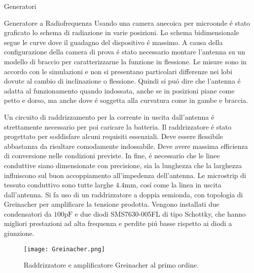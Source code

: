 \begin{section}{Generatori}
\begin{subsection}{Generatore a Radiofrequenza}
        Usando una camera anecoica per microonde \'e stato graficato lo schema di radiazione in varie posizioni. Lo schema bidimensionale segue le curve dove il guadagno del dispositivo \'e massimo. A causa della configurazione della camera di prova \'e stato necessario montare l'antenna su un modello di braccio per caratterizzarne la funzione in flessione. Le misure sono in accordo con le simulazioni e non si presentano particolari differenze nei lobi dovute al cambio di inclinazione o flessione. Quindi si pu\'o dire che l'antenna \'e adatta al funzionamento quando indossata, anche se in posizioni piane come petto e dorso, ma anche dove \'e soggetta alla curvatura come in gambe e braccia.

        Un circuito di raddrizzamento per la corrente in uscita dall'antenna \'e strettamente necessario per poi caricare la batteria. Il raddrizzatore \'e stato progettato per soddisfare alcuni requisiti essenziali. Deve essere flessibile abbastanza da risultare comodamente indossabile. Deve avere massima efficienza di conversione nelle condizioni previste. In fine, \'e necessario che le linee conduttive siano dimensionate con precisione, sia la lunghezza che la larghezza influiscono sul buon accoppiamento all'impedenza dell'antenna. Le microstrip di tessuto conduttivo sono tutte larghe \(4.4\mathrm{mm}\), cos\'i come la linea in uscita dall'antenna. Si fa uso di un raddrizzatore a doppia semionda, con topologia di Greinacher per amplificare la tensione prodotta. Vengono installati due condensatori da \(100\mathrm{pF}\) e due diodi SMS7630-005FL di tipo Schottky, che hanno migliori prestazioni ad alta frequenza e perdite pi\'u basse rispetto ai diodi a giunzione. 

        \begin{figure}[H]
            \texttt{[image: Greinacher.png]}
            \centering
            \caption{Raddrizzatore e amplificatore Greinacher al primo ordine.}
            \label{fig:Greinacher}
        \end{figure}
        

\end{subsection}
\end{section}
